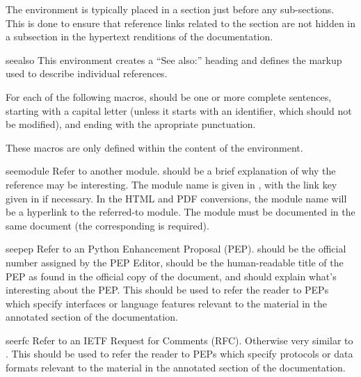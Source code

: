 \documentclass{howto}
\begin{document}
    The  environment is typically placed in a section
    just before any sub-sections.  This is done to ensure that
    reference links related to the section are not hidden in a
    subsection in the hypertext renditions of the documentation.

    \begin{envdesc}{seealso}{}
      This environment creates a ``See also:'' heading and defines the
      markup used to describe individual references.
    \end{envdesc}

    For each of the following macros,  should be one or more
    complete sentences, starting with a capital letter (unless it
    starts with an identifier, which should not be modified), and
    ending with the apropriate punctuation.

    These macros are only defined within the content of the
     environment.

    \begin{macrodesc}{seemodule}{}
      Refer to another module.   should be a brief
      explanation of why the reference may be interesting.  The module
      name is given in , with the link key given in
       if necessary.  In the HTML and PDF conversions, the
      module name will be a hyperlink to the referred-to module.
        The module must be documented in the same
      document (the corresponding  is required).
    \end{macrodesc}

    \begin{macrodesc}{seepep}{}
      Refer to an Python Enhancement Proposal (PEP).  
      should be the official number assigned by the PEP Editor,
       should be the human-readable title of the PEP as
      found in the official copy of the document, and  should
      explain what's interesting about the PEP.  This should be used
      to refer the reader to PEPs which specify interfaces or language
      features relevant to the material in the annotated section of the
      documentation.
    \end{macrodesc}

    \begin{macrodesc}{seerfc}{}
      Refer to an IETF Request for Comments (RFC).  Otherwise very
      similar to .  This should be used
      to refer the reader to PEPs which specify protocols or data
      formats relevant to the material in the annotated section of the
      documentation.
    \end{macrodesc}
\end{document}
